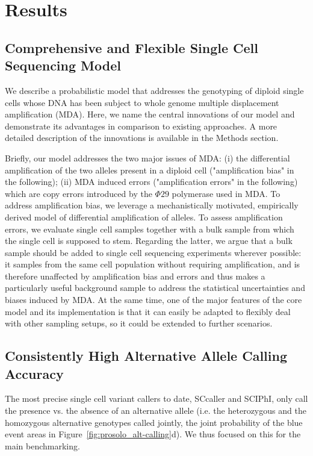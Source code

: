\documentclass[12pt,inline]{wlscirep}
\begin{document}
\section*{Results}

\subsection*{Comprehensive and Flexible Single Cell Sequencing Model}

We describe a probabilistic model that addresses the genotyping of diploid single cells whose DNA has been subject to whole genome multiple displacement amplification (MDA)\cite{dean_comprehensive_2002}.
Here, we name the central innovations of our model and demonstrate its advantages in comparison to existing approaches.
A more detailed description of the innovations is available in the Methods section.

Briefly, our model addresses the two major issues of MDA: (i) the differential amplification of the two alleles present in a diploid cell ("amplification bias" in the following); (ii) MDA induced errors ("amplification errors" in the following) which are copy errors introduced by the $\Phi29$ polymerase used in MDA.
To address amplification bias, we leverage a mechanistically motivated, empirically derived model of differential amplification of alleles.
To assess amplification errors, we evaluate single cell samples together with a bulk sample from which the single cell is supposed to stem.
Regarding the latter, we argue that a bulk sample should be added to single cell sequencing experiments wherever possible: it samples from the same cell population without requiring amplification, and is therefore unaffected by amplification bias and errors and thus makes a particularly useful background sample to address the statistical uncertainties and biases induced by MDA.
At the same time, one of the major features of the core model and its implementation is that it can easily be adapted to flexibly deal with other sampling setups, so it could be extended to further scenarios.

\subsection*{Consistently High Alternative Allele Calling Accuracy}

The most precise single cell variant callers to date, SCcaller and SCIPhI, only call the presence vs. the absence of an alternative allele (i.e. the heterozygous and the homozygous alternative genotypes called jointly, the joint probability of the blue event areas in Figure~\ref{fig:prosolo_alt-calling}d).
We thus focused on this for the main benchmarking.
\end{document}
